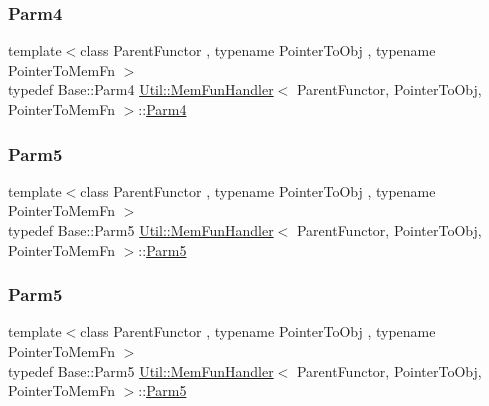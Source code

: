 \subsubsection{\texorpdfstring{Parm4}{Parm4}\hspace{0.1cm}{\footnotesize\ttfamily [3/3]}}
{\footnotesize\ttfamily template$<$class Parent\+Functor , typename Pointer\+To\+Obj , typename Pointer\+To\+Mem\+Fn $>$ \\
typedef Base\+::\+Parm4 \mbox{\hyperlink{classUtil_1_1MemFunHandler}{Util\+::\+Mem\+Fun\+Handler}}$<$ Parent\+Functor, Pointer\+To\+Obj, Pointer\+To\+Mem\+Fn $>$\+::\mbox{\hyperlink{classUtil_1_1MemFunHandler_a1e5a0cf582f3b540e409d333ae06a4bd}{Parm4}}}

\mbox{\label{classUtil_1_1MemFunHandler_a70d588c17500255eb899788aa0e6c29d}} 
\subsubsection{\texorpdfstring{Parm5}{Parm5}\hspace{0.1cm}{\footnotesize\ttfamily [1/3]}}
{\footnotesize\ttfamily template$<$class Parent\+Functor , typename Pointer\+To\+Obj , typename Pointer\+To\+Mem\+Fn $>$ \\
typedef Base\+::\+Parm5 \mbox{\hyperlink{classUtil_1_1MemFunHandler}{Util\+::\+Mem\+Fun\+Handler}}$<$ Parent\+Functor, Pointer\+To\+Obj, Pointer\+To\+Mem\+Fn $>$\+::\mbox{\hyperlink{classUtil_1_1MemFunHandler_a70d588c17500255eb899788aa0e6c29d}{Parm5}}}

\mbox{\label{classUtil_1_1MemFunHandler_a70d588c17500255eb899788aa0e6c29d}} 
\subsubsection{\texorpdfstring{Parm5}{Parm5}\hspace{0.1cm}{\footnotesize\ttfamily [2/3]}}
{\footnotesize\ttfamily template$<$class Parent\+Functor , typename Pointer\+To\+Obj , typename Pointer\+To\+Mem\+Fn $>$ \\
typedef Base\+::\+Parm5 \mbox{\hyperlink{classUtil_1_1MemFunHandler}{Util\+::\+Mem\+Fun\+Handler}}$<$ Parent\+Functor, Pointer\+To\+Obj, Pointer\+To\+Mem\+Fn $>$\+::\mbox{\hyperlink{classUtil_1_1MemFunHandler_a70d588c17500255eb899788aa0e6c29d}{Parm5}}}

